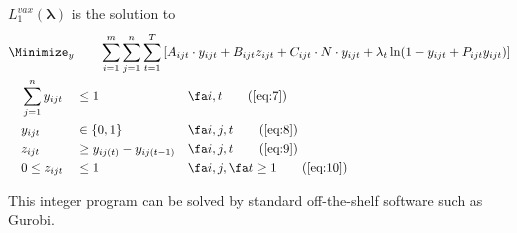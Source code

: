 \documentclass{article}
\begin{document}
\begin{minipage}{\linewidth}
{
    $L_1^{vax}(\bm{\lambda})$ is the solution to\\
    \small
    \begin{alignat}{4}
        &\Minimize_{y}\qquad \span\span\span\span\span\span \sum_{i=1}^{m}\sum_{j=1}^{n}\sum_{t=1}^{T} \left[A_{ijt}\cdot y_{ijt} + B_{ijt}z_{ijt} + C_{ijt}\cdot N \cdot y_{ijt}  + \lambda_t \ln (1-y_{ijt} + P_{ijt} y_{ijt}) \right]\nonumber\\
         & {} && \sum_{j=1}^{n}y_{ijt}  &&\le 1 && \fa i,t \tag{\ref{eq:7}}\\
         & {} && y_{ijt} &&\in \{0,1\} && \fa i,j,t \tag{\ref{eq:8}}\\
         & {} && z_{ijt} &&\ge y_{ij(t)}-y_{ij(t-1)}  && \fa i,j, t \tag{\ref{eq:9}}\\
         & {} && 0 \le z_{ijt} &&\le 1 && \fa i,j, \fa t\ge 1 \tag{\ref{eq:10}}
    \end{alignat}
}

This integer program can be solved by standard off-the-shelf software such as Gurobi.

\end{minipage}\\
\end{document}
